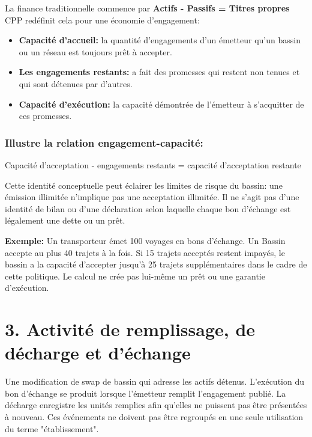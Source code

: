 \documentclass[11pt]{article}
\begin{document}
La finance traditionnelle commence par \textbf{Actifs - Passifs = Titres propres} CPP redéfinit cela pour une économie d'engagement:

\begin{itemize}[leftmargin=*]
\item \textbf{Capacité d'accueil:} la quantité d'engagements d'un émetteur qu'un bassin ou un réseau est toujours prêt à accepter.
\item \textbf{Les engagements restants:} a fait des promesses qui restent non tenues et qui sont détenues par d'autres.
\item \textbf{Capacité d'exécution:} la capacité démontrée de l'émetteur à s'acquitter de ces promesses.
\end{itemize}
\subsubsection*{Illustre la relation engagement-capacité:}

Capacité d'acceptation - engagements restants = capacité d'acceptation restante

Cette identité conceptuelle peut éclairer les limites de risque du bassin: une émission illimitée n'implique pas une acceptation illimitée. Il ne s'agit pas d'une identité de bilan ou d'une déclaration selon laquelle chaque bon d'échange est légalement une dette ou un prêt.

\textbf{Exemple:} Un transporteur émet 100 voyages en bons d'échange. Un Bassin accepte au plus 40 trajets à la fois. Si 15 trajets acceptés restent impayés, le bassin a la capacité d'accepter jusqu'à 25 trajets supplémentaires dans le cadre de cette politique. Le calcul ne crée pas lui-même un prêt ou une garantie d'exécution.



\section*{3. Activité de remplissage, de décharge et d'échange}

Une modification de swap de bassin qui adresse les actifs détenus. L'exécution du bon d'échange se produit lorsque l'émetteur remplit l'engagement publié. La décharge enregistre les unités remplies afin qu'elles ne puissent pas être présentées à nouveau. Ces événements ne doivent pas être regroupés en une seule utilisation du terme "établissement".
\end{document}
